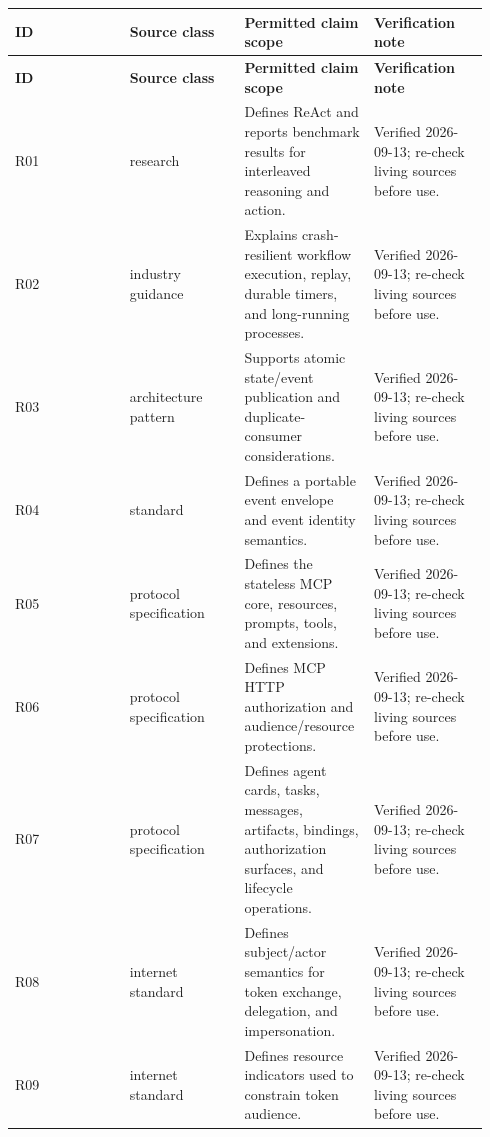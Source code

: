 \BookTableStart
\fontsize{7.2}{9}\selectfont
\begin{longtable}{@{}Y{0.2350\linewidth}Y{0.2350\linewidth}Y{0.2350\linewidth}Y{0.2350\linewidth}@{}}
\color{white}\bfseries ID & \color{white}\bfseries Source class & \color{white}\bfseries Permitted claim scope & \color{white}\bfseries Verification note \\
\endfirsthead
{}
\color{white}\bfseries ID & \color{white}\bfseries Source class & \color{white}\bfseries Permitted claim scope & \color{white}\bfseries Verification note \\
\endhead
R01 & research & Defines ReAct and reports benchmark results for interleaved reasoning and action. & Verified 2026-09-13; re-check living sources before use. \\
R02 & industry guidance & Explains crash-resilient workflow execution, replay, durable timers, and long-running processes. & Verified 2026-09-13; re-check living sources before use. \\
R03 & architecture pattern & Supports atomic state/event publication and duplicate-consumer considerations. & Verified 2026-09-13; re-check living sources before use. \\
R04 & standard & Defines a portable event envelope and event identity semantics. & Verified 2026-09-13; re-check living sources before use. \\
R05 & protocol specification & Defines the stateless MCP core, resources, prompts, tools, and extensions. & Verified 2026-09-13; re-check living sources before use. \\
R06 & protocol specification & Defines MCP HTTP authorization and audience/resource protections. & Verified 2026-09-13; re-check living sources before use. \\
R07 & protocol specification & Defines agent cards, tasks, messages, artifacts, bindings, authorization surfaces, and lifecycle operations. & Verified 2026-09-13; re-check living sources before use. \\
R08 & internet standard & Defines subject/actor semantics for token exchange, delegation, and impersonation. & Verified 2026-09-13; re-check living sources before use. \\
R09 & internet standard & Defines resource indicators used to constrain token audience. & Verified 2026-09-13; re-check living sources before use. \\

\end{longtable}
